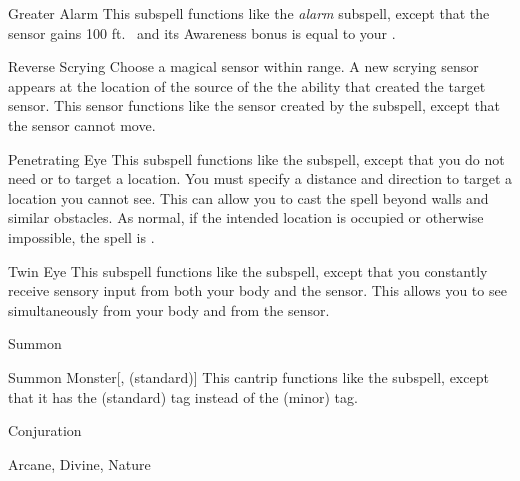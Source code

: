 \begin{ability}[\nth{3}]{Greater Alarm}
This subspell functions like the \textit{alarm} subspell, except that the sensor gains 100 ft.\  and its Awareness bonus is equal to your .
\end{ability}
\vspace{0.25em}


\begin{ability}[\nth{4}]{Reverse Scrying}
Choose a magical sensor within \rngmed range.
A new scrying sensor appears at the location of the source of the the ability that created the target sensor.
This sensor functions like the sensor created by the  subspell, except that the sensor cannot move.
\end{ability}
\vspace{0.25em}


\begin{ability}[\nth{5}]{Penetrating Eye}
This subspell functions like the  subspell, except that you do not need  or  to target a location.
You must specify a distance and direction to target a location you cannot see.
This can allow you to cast the spell beyond walls and similar obstacles.
As normal, if the intended location is occupied or otherwise impossible, the spell is .
\end{ability}
\vspace{0.25em}


\begin{ability}[\nth{5}]{Twin Eye}
This subspell functions like the  subspell, except that you constantly receive sensory input from both your body and the sensor.
This allows you to see simultaneously from your body and from the sensor.
\end{ability}
\vspace{0.25em}

\newpage
\begin{spellsection}{Summon}

\begin{spellheader}
\end{spellheader}


\begin{ability}{Summon Monster}[,  (standard)]
This cantrip functions like the  subspell, except that it has the  (standard) tag instead of the  (minor) tag.
\end{ability}




 Conjuration

 Arcane, Divine, Nature
\end{spellsection}


